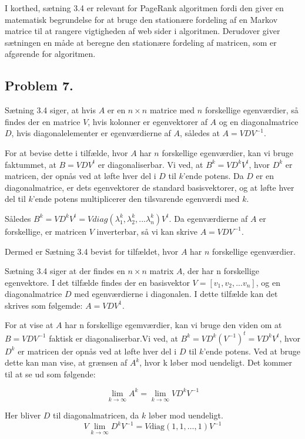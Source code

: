 I korthed, sætning 3.4 er relevant for PageRank algoritmen fordi den giver en matematisk begrundelse for at bruge den stationære fordeling af en Markov matrice til at rangere vigtigheden af web sider i algoritmen. Derudover giver sætningen en måde at beregne den stationære fordeling af matricen, som er afgørende for algoritmen.

\subsection{Problem 7.}

Sætning 3.4 siger, at hvis $A$ er en $n \times n$ matrice med $n$ forskellige egenværdier, så findes der en matrice $V$, hvis kolonner er egenvektorer af $A$ og en diagonalmatrice $D$, hvis diagonalelementer er egenværdierne af $A$, således at $A = VDV^{-1}$.

For at bevise dette i tilfælde, hvor $A$ har $n$ forskellige egenværdier, kan vi bruge faktummet, at $B = V DV^{t}$ er diagonaliserbar. Vi ved, at $B^k = V D^{k} V^{t}$, hvor $D^{k}$ er matricen, der opnås ved at løfte hver del i $D$ til $k$'ende potens. Da $D$ er en diagonalmatrice, er dets egenvektorer de standard basisvektorer, og at løfte hver del til $k$'ende potens multiplicerer den tilsvarende egenværdi med $k$.

Således $B^k = V D^{k} V^{t} = V diag(\lambda_1^k, \lambda_2^k, . . . \lambda_n^k) V^{t}$. Da egenværdierne af $A$ er forskellige, er matricen $V$ inverterbar, så vi kan skrive $A = VDV^{-1}$.

Dermed er Sætning 3.4 bevist for tilfældet, hvor $A$ har $n$ forskellige egenværdier.

Sætning 3.4 siger at der findes en $n \times n$ matrix $A$, der har n forskellige egenvektore. I det tilfælde findes der en basisvektor $V = [v_1,v_2,...v_n]$, og en diagonalmatrice $D$ med egenværdierne i diagonalen. I dette tilfælde kan det skrives som følgemde: $A=VDV^1$.

For at vise at $A$ har n forskellige egemværdier, kan vi bruge den viden om at $B = VDV^{-1}$ faktisk er diagonaliserbar.Vi ved, at $B^k = V D^k (V^{-1})^t = V D^k V^t$, hvor $D^k$ er matricen der opnås ved at løfte hver del i $D$ til $k$'ende potens. Ved at bruge dette kan man vise, at grænsen af $A^k$, hvor k løber mod uendeligt. Det kommer til at se ud som følgende:

$$\lim_{k \rightarrow \infty} A^k = \lim_{k \rightarrow \infty} V D^k V^{-1} $$

Her bliver $D$ til diagonalmatricen, da $k$ løber mod uendeligt. 
$$V \lim_{k \rightarrow \infty} D^k V^{-1} = V \text{diag}(1, 1, \dots, 1) V^{-1} $$

